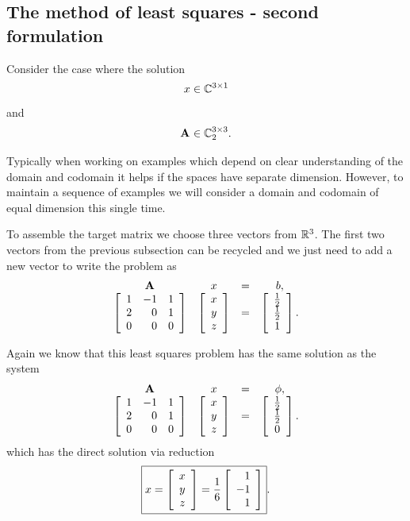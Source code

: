 \subsection{The method of least squares - second formulation}
Consider the case where the solution
\begin{equation}
  x\in\cmplx{\by{3}{1}}
\end{equation}
and
\begin{equation}
  \A{}\in\cmplx{\by{3}{3}}_{2}.
\end{equation}

Typically when working on examples which depend on clear understanding of the domain and codomain it helps if the spaces have separate dimension. However, to maintain a sequence of examples we will consider a domain and codomain of equal dimension this single time.

To assemble the target matrix we choose three vectors from $\real{3}$. The first two vectors from the previous subsection can be recycled and we just need to add a new vector to write the problem as
\begin{equation}
  \begin{array}{cccc}
    \A{} & x & = & b, \\
    \mat{crc}{1&-1&1\\2&0&1\\0&0&0} & \mat{c}{x\\y\\z} & = &  \mat{c}{\frac{1}{2}\\\frac{1}{2}\\1}.
  \end{array}
  \label{eq:lsq:form3}
\end{equation}

Again we know that this least squares problem has the same solution as the system
\begin{equation}
  \begin{array}{cccc}
    \A{} & x & = & \phi, \\
    \mat{crc}{1&-1&1\\2&0&1\\0&0&0} & \mat{c}{x\\y\\z} & = & \mat{c}{\frac{1}{2}\\\frac{1}{2}\\0}.
  \end{array}
  \label{eq:lsq:form3}
\end{equation}
which has the direct solution via reduction
\begin{equation}
\boxed{
  x = \mat{c}{x\\y\\z}=\frac{1}{6}\mat{r}{1\\-1\\1}
  }.
\end{equation}

